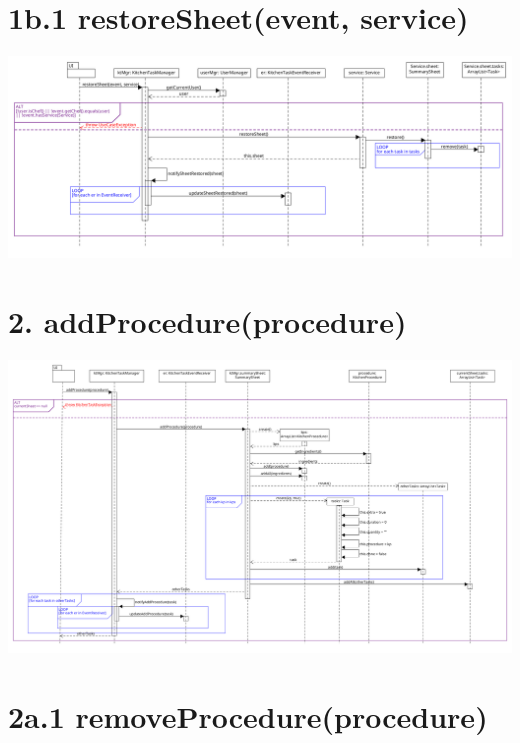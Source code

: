 \pagebreak

\section*{1b.1 restoreSheet(event, service)}

\begin{center}
  \includegraphics[scale = 0.25]{images/DSD/DSD 1b.png}
\end{center}

\pagebreak

\section*{2. addProcedure(procedure)}

\begin{center}
  \includegraphics[scale = 0.22]{images/DSD/DSD 2.png}
\end{center}

\pagebreak

\section*{2a.1 removeProcedure(procedure)}

